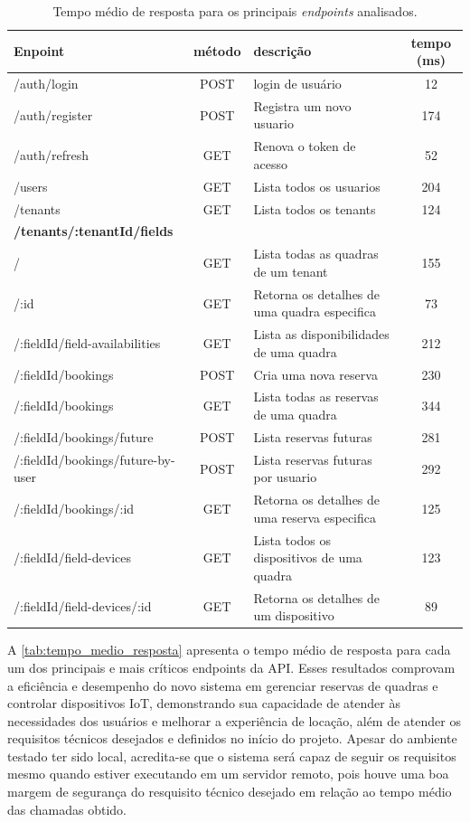 \begin{table}[htb]
  \centering
  \caption{\label{tab:tempo_medio_resposta}Tempo médio de resposta para os principais \textit{endpoints} analisados.}
  \begin{tabular}{|m{6cm}|c|p{4cm}|c|}
  \hline
  \textbf{Enpoint} & \textbf{método} & \textbf{descrição} & \textbf{tempo (ms)} \\ \hline
  /auth/login & POST & login de usuário & 12 \\ \hline
  /auth/register & POST & Registra um novo usuario & 174 \\ \hline
  /auth/refresh & GET & Renova o token de acesso & 52 \\ \hline
  /users & GET & Lista todos os usuarios & 204 \\ \hline
  /tenants & GET & Lista todos os tenants & 124 \\ \hline
  \textbf{/tenants/:tenantId/fields} & & & \\ \hline
  / & GET & Lista todas as quadras de um tenant & 155 \\ \hline
  /:id & GET & Retorna os detalhes de uma quadra especifica & 73 \\ \hline
  /:fieldId/field-availabilities & GET & Lista as disponibilidades de uma quadra & 212 \\ \hline
  /:fieldId/bookings & POST & Cria uma nova reserva & 230 \\ \hline
  /:fieldId/bookings & GET & Lista todas as reservas de uma quadra & 344 \\ \hline
  /:fieldId/bookings/future & POST & Lista reservas futuras & 281 \\ \hline
  /:fieldId/bookings/future-by-user & POST & Lista reservas futuras por usuario & 292 \\ \hline
  /:fieldId/bookings/:id & GET & Retorna os detalhes de uma reserva especifica & 125 \\ \hline
  /:fieldId/field-devices & GET & Lista todos os dispositivos de uma quadra & 123 \\ \hline
  /:fieldId/field-devices/:id & GET & Retorna os detalhes de um dispositivo & 89 \\ \hline
  \end{tabular}
\end{table}

A \autoref{tab:tempo_medio_resposta} apresenta o tempo médio de resposta para cada um dos principais e mais críticos endpoints da \acrshort{API}. Esses resultados comprovam a eficiência e desempenho do novo sistema em gerenciar reservas de quadras e controlar dispositivos IoT, demonstrando sua capacidade de atender às necessidades dos usuários e melhorar a experiência de locação, além de atender os requisitos técnicos desejados e definidos no início do projeto. Apesar do ambiente testado ter sido local, acredita-se que o sistema será capaz de seguir os requisitos mesmo quando estiver executando em um servidor remoto, pois houve uma boa margem de segurança do resquisito técnico desejado em relação ao tempo médio das chamadas obtido.


